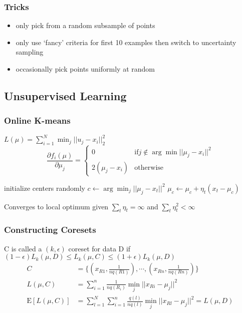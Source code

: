 \documentclass[10pt,parskip]{scrartcl}
\begin{document}
\begin{multicols*}{3}
\subsubsection{Tricks} %
\label{ssub:tricks}
\begin{itemize}
	\item only pick from a random subsample of points
	\item only use `fancy' criteria for first 10 examples then switch to uncertainty sampling 
	\item occasionally pick points uniformly at random
\end{itemize}

\subsection{Unsupervised Learning} %
\label{sub:unsupervised_learning}
\subsubsection{Online K-means} %
\label{ssub:k_means}

$L(\mu) = \sum_{i=1}^N \min_j ||u_j - x_i||_2^2$
$$
\frac{\partial f_i(\mu)}{\partial \mu_j} = 
\begin{cases}
0 & \text{if} j \notin \arg\min ||\mu_j-x_i||^2 \\
2(\mu_j-x_i) & \text{otherwise}	
\end{cases}
$$
\begin{mdframed}
	\begin{algorithmic}
		\State initialize centers randomly
			\State $c \gets \arg\min_j||\mu_j-x_t||^2$
			\State $\mu_c \gets \mu_c + \eta_t(x_t-\mu_c)$
		\EndFor
	\end{algorithmic}
\end{mdframed}
Converges to local optimum given $\sum_t \eta_t = \infty$ and $\sum_t \eta_t^2 < \infty$
\subsubsection{Constructing Coresets} %
\label{ssub:constructing_coresets}
C is called a $(k,\epsilon)$ coreset for data D if \\
$(1-\epsilon)L_k(\mu,D) \leq L_k(\mu,C) \leq (1+\epsilon)L_k(\mu,D)$
\begin{align}
C&=\{(x_{R1},\frac{1}{nq(R1)}),\cdots,(x_{Rn},\frac{1}{nq(Rn)})\} \\
L(\mu,C) &= \sum_{i=1}^n \frac{1}{nq(R_i)} \min_j ||x_{Ri}-\mu_j||^2 \\
\mathrm{E}[L(\mu,C) ] &= \sum_{l=1}^N \sum_{i=1}^n\frac{q(l)}{nq(l)} \min_j ||x_{Rl}-\mu_j||^2 = L(\mu,D)
\end{align}


\end{multicols*}
\end{document}
